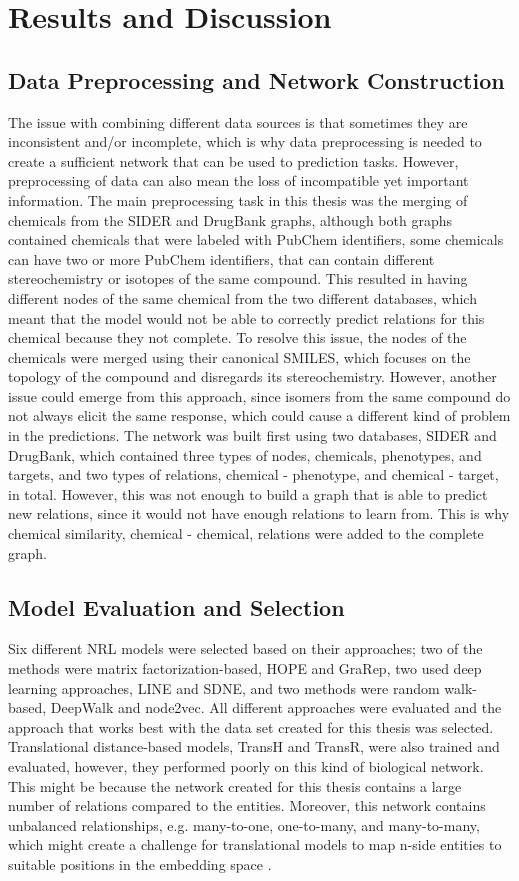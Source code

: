 \chapter{Results and Discussion}
\label{results}

\section{Data Preprocessing and Network Construction}
The issue with combining different data sources is that sometimes they are inconsistent and/or incomplete, which is why data preprocessing is needed to create a sufficient network that can be used to prediction tasks. However, preprocessing of data can also mean the loss of incompatible yet important information. The main preprocessing task in this thesis was the merging of chemicals from the \ac{SIDER} and DrugBank graphs, although both graphs contained chemicals that were labeled with PubChem identifiers, some chemicals can have two or more PubChem identifiers, that can contain different stereochemistry or isotopes of the same compound. This resulted in having different nodes of the same chemical from the two different databases, which meant that the model would not be able to correctly predict relations for this chemical because they not complete. To resolve this issue, the nodes of the chemicals were merged using their canonical \ac{SMILES}, which focuses on the topology of the compound and disregards its stereochemistry. However, another issue could emerge from this approach, since isomers from the same compound do not always elicit the same response, which could cause a different kind of problem in the predictions.
The network was built first using two databases, \ac{SIDER} and DrugBank, which contained three types of nodes, chemicals, phenotypes, and targets, and two types of relations, chemical - phenotype, and chemical - target, in total. However, this was not enough to build a graph that is able to predict new relations, since it would not have enough relations to learn from. This is why chemical similarity, chemical - chemical, relations were added to the complete graph.

\section{Model Evaluation and Selection}
Six different \ac{NRL} models were selected based on their approaches; two of the methods were matrix factorization-based, \ac{HOPE} and \ac{GraRep}, two used deep learning approaches, \ac{LINE} and \ac{SDNE}, and two methods were random walk-based, DeepWalk and node2vec. All different approaches were evaluated and the approach that works best with the data set created for this thesis was selected. Translational distance-based models, TransH and TransR, were also trained and evaluated, however, they performed poorly on this kind of biological network. This might be because the network created for this thesis contains a large number of relations compared to the entities. Moreover, this network contains unbalanced relationships, e.g. many-to-one, one-to-many, and many-to-many, which might create a challenge for translational models to map n-side entities to suitable positions in the embedding space \cite{liang_predicting_2019}.

